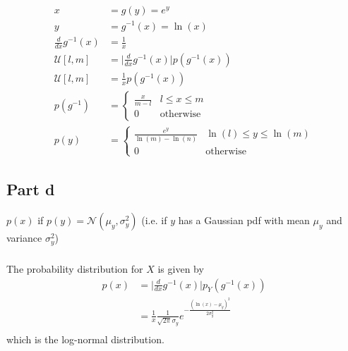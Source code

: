 \documentclass[11pt]{article}
\begin{document}
\subparagraph*{}

\begin{align*}
	x &= g(y) = e^y \\
	y &= g^{-1}(x) = \ln(x) \\
	\frac{d}{dx}g^{-1}(x) &= \frac{1}{x} \\
	\mathcal{U}[l,m] &= \Big|\frac{d}{dx}g^{-1}(x)\Big|p(g^{-1}(x)) \\
	\mathcal{U}[l,m] &= \frac{1}{x}p(g^{-1}(x)) \\
	p(g^{-1}) &= \begin{cases} \frac{x}{m-l} & l \leq x \leq m \\ 0 & \text{otherwise} \end{cases} \\
	p(y) &= \begin{cases} \frac{e^y}{\ln(m)-\ln(n)} & \ln(l) \leq y \leq \ln(m) \\ 0 & \text{otherwise} \end{cases}
\end{align*}

\subsection*{Part d}
$p(x)$ if $p(y) = \mathcal{N}(\mu_y,\sigma_y^2)$ (i.e. if $y$ has a Gaussian pdf with mean $\mu_y$ and variance $\sigma_y^2$)

\subparagraph*{}
The probability distribution for $X$ is given by
\begin{align*}
	p(x) &= \Big|\frac{d}{dx}g^{-1}(x)\Big|p_Y(g^{-1}(x)) \\
	&= \frac{1}{x} \frac{1}{\sqrt{2\pi}\sigma_y}e^{-\frac{(\ln(x)-\mu_y)^2}{2\sigma_y^2}} \\
\end{align*}
which is the log-normal distribution.
\end{document}
